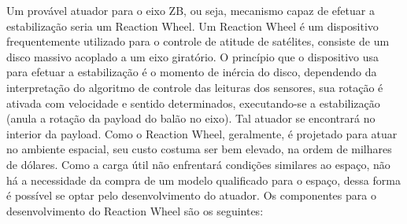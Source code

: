 Um provável atuador para o eixo ZB, ou seja, mecanismo capaz de efetuar a estabilização seria um Reaction Wheel. Um Reaction Wheel é um dispositivo frequentemente utilizado para o controle de atitude de satélites, consiste de um disco massivo acoplado a um eixo giratório. O princípio que o dispositivo usa para efetuar a estabilização é o momento de inércia do disco, dependendo da interpretação do algoritmo de controle das leituras dos sensores, sua rotação é ativada com velocidade e sentido determinados, executando-se a estabilização (anula a rotação da payload do balão no eixo). Tal atuador se encontrará no interior da payload. Como o Reaction Wheel, geralmente, é projetado para atuar no ambiente espacial, seu custo costuma ser bem elevado, na ordem de milhares de dólares. Como a carga útil não enfrentará condições similares ao espaço, não há a necessidade da compra de um modelo qualificado para o espaço, dessa forma é possível se optar pelo desenvolvimento do atuador. Os componentes para o desenvolvimento do Reaction Wheel são os seguintes:

